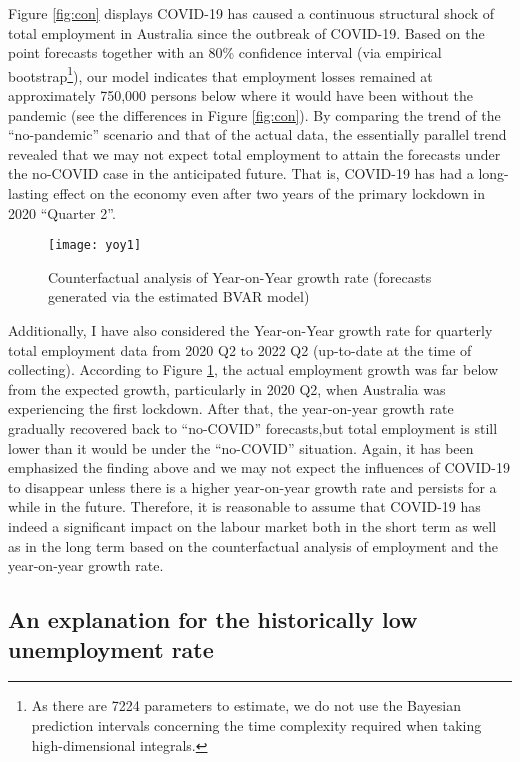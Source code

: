\documentclass{monashthesis}
\begin{document}
Figure \ref{fig:con} displays COVID-19 has caused a continuous structural shock of total employment in Australia since the outbreak of COVID-19. Based on the point forecasts together with an 80\% confidence interval (via empirical bootstrap\footnote{As there are 7224 parameters to estimate, we do not use the Bayesian prediction intervals concerning the time complexity required when taking high-dimensional integrals.}), our model indicates that employment losses remained at approximately 750,000 persons below where it would have been without the pandemic (see the differences in Figure \ref{fig:con}). By comparing the trend of the ``no-pandemic'' scenario and that of the actual data, the essentially parallel trend revealed that we may not expect total employment to attain the forecasts under the no-COVID case in the anticipated future. That is, COVID-19 has had a long-lasting effect on the economy even after two years of the primary lockdown in 2020 ``Quarter 2''.

\begin{figure}[H]
\texttt{[image: yoy1]}
\centering
\caption{Counterfactual analysis of Year-on-Year growth rate (forecasts generated via the estimated BVAR model)}
\label{fig:yoy}
\end{figure}

Additionally, I have also considered the Year-on-Year growth rate for quarterly total employment data from 2020 Q2 to 2022 Q2 (up-to-date at the time of collecting). According to Figure \ref{fig:yoy}, the actual employment growth was far below from the expected growth, particularly in 2020 Q2, when Australia was experiencing the first lockdown. After that, the year-on-year growth rate gradually recovered back to ``no-COVID'' forecasts,but total employment is still lower than it would be under the ``no-COVID'' situation. Again, it has been emphasized the finding above and we may not expect the influences of COVID-19 to disappear unless there is a higher year-on-year growth rate and persists for a while in the future. Therefore, it is reasonable to assume that COVID-19 has indeed a significant impact on the labour market both in the short term as well as in the long term based on the counterfactual analysis of employment and the year-on-year growth rate.

\hypertarget{an-explanation-for-the-historically-low-unemployment-rate}{%
\subsection{An explanation for the historically low unemployment rate}\label{an-explanation-for-the-historically-low-unemployment-rate}}
\end{document}

